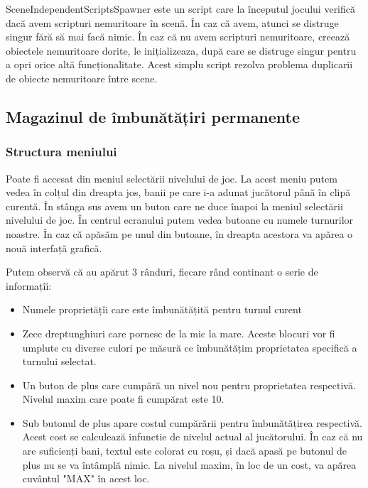 \documentclass[12pt, a4paper]{article}
\begin{document}
	SceneIndependentScriptsSpawner este un script care la începutul jocului verifică dacă avem scripturi nemuritoare în scenă. În caz că avem, atunci se distruge singur fără să mai facă nimic. În caz că nu avem scripturi nemuritoare, creează obiectele nemuritoare dorite, le inițializeaza, după care se distruge singur pentru a opri orice altă funcționalitate. Acest simplu script rezolva problema duplicarii de obiecte nemuritoare între scene.
	
	
	
	
	
	\subsection{Magazinul de îmbunătățiri permanente}
	\label{section: permanentUpgrade}
	
	\subsubsection{Structura meniului}
	
	Poate fi accesat din meniul selectării nivelului de joc. La acest meniu putem vedea în colțul din dreapta jos, banii pe care i-a adunat jucătorul până în clipă curentă. În stânga sus avem un buton care ne duce înapoi la meniul selectării nivelului de joc. În centrul ecranului putem vedea butoane cu numele turnurilor noastre. În caz că apăsăm pe unul din butoane, în dreapta acestora va apărea o nouă interfață grafică.
	\newline
	
	Putem observă că au apărut 3 rânduri, fiecare rând continant o serie de informațîi:
	
	\begin{itemize}
		\item Numele proprietățîi care este îmbunătățită pentru turnul curent
		\item Zece dreptunghiuri care pornesc de la mic la mare. Aceste blocuri vor fi umplute cu diverse culori pe măsură ce îmbunătățim proprietatea specifică a turnului selectat.
		\item Un buton de plus care cumpără un nivel nou pentru proprietatea respectivă. Nivelul maxim care poate fi cumpărat este 10.
		\item Sub butonul de plus apare costul cumpărării pentru îmbunătățirea respectivă. Acest cost se calculează infunctie de nivelul actual al jucătorului. În caz că nu are suficienți bani, textul este colorat cu roșu, și dacă apasă pe butonul de plus nu se va întâmplă nimic. La nivelul maxim, în loc de un cost, va apărea cuvântul "MAX" în acest loc.
	\end{itemize}
	
\end{document}
